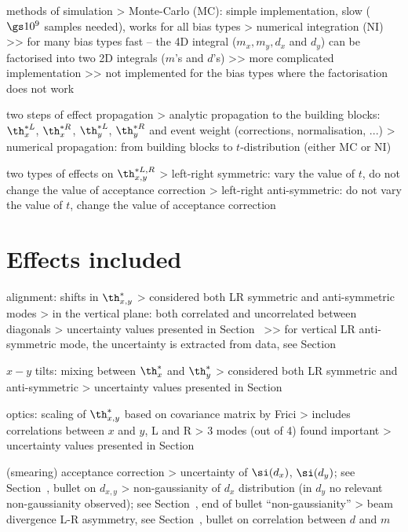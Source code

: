  methods of simulation
\>> Monte-Carlo (MC): simple implementation, slow ($\gs 10^9$ samples needed), works for all bias types
\>> numerical integration (NI)
\>>> for many bias types fast -- the 4D integral ($m_x, m_y, d_x$ and $d_y$) can be factorised into two 2D integrals ($m$'s and $d$'s)
\>>> more complicated implementation
\>>> not implemented for the bias types where the factorisation does not work

\> two steps of effect propagation
\>> analytic propagation to the building blocks: $\th^{*L}_x$, $\th^{*R}_x$, $\th^{*L}_y$, $\th^{*R}_y$ and event weight (corrections, normalisation, ...)
\>> numerical propagation: from building blocks to $t$-distribution (either MC or NI)

\> two types of effects on $\th^{*L,R}_{x, y}$
\>> left-right symmetric: vary the value of $t$, do not change the value of acceptance correction
\>> left-right anti-symmetric: do not vary the value of $t$, change the value of acceptance correction


\section[systematics-effects]{Effects included}

\> alignment: shifts in $\th^*_{x,y}$
\>> considered both LR symmetric and anti-symmetric modes
\>> in the vertical plane: both correlated and uncorrelated between diagonals
\>> uncertainty values presented in Section~
\>>> for vertical LR anti-symmetric mode, the uncertainty is extracted from data, see Section~

\> $x-y$ tilts: mixing between $\th^*_{x}$ and $\th^*_{y}$
\>> considered both LR symmetric and anti-symmetric
\>> uncertainty values presented in Section~

\> optics: scaling of $\th^*_{x,y}$ based on covariance matrix by Frici
\>> includes correlations between $x$ and $y$, L and R
\>> 3 modes (out of 4) found important
\>> uncertainty values presented in Section~

\> (smearing) acceptance correction
\>> uncertainty of $\si(d_x)$, $\si(d_y)$; see Section~, bullet on $d_{x,y}$
\>> non-gaussianity of $d_x$ distribution (in $d_y$ no relevant non-gaussianity observed); see Section~, end of bullet ``non-gaussianity''
\>> beam divergence L-R asymmetry, see Section~, bullet on correlation between $d$ and $m$

